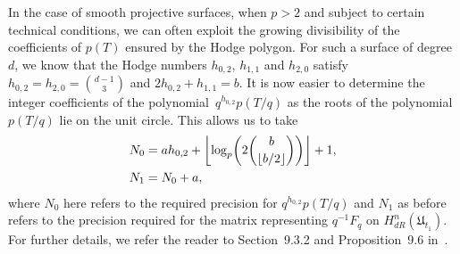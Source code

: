 \begin{rem} \label{rem:N0Surfaces}
In the case of smooth projective surfaces, when $p > 2$ and subject to 
certain technical conditions, we can often exploit the growing divisibility 
of the coefficients of $p(T)$ ensured by the Hodge polygon.  For such a surface 
of degree~$d$, we know that the Hodge numbers $h_{0,2}$, $h_{1,1}$ and $h_{2,0}$ 
satisfy $h_{0,2} = h_{2,0} = \binom{d-1}{3}$ and $2 h_{0,2} + h_{1,1} = b$. 
It is now easier to determine the integer coefficients of the 
polynomial~$q^{h_{0,2}} p(T/q)$ as the roots of the polynomial $p(T/q)$ lie 
on the unit circle.  This allows us to take 
\begin{align*}
N_0 & = a h_{0,2} + \left\lfloor\log_p \biggl( 2 \binom{b}{\left\lfloor b/2\right\rfloor}\biggr)\right\rfloor + 1,\\
N_1 & = N_0 + a,
\end{align*}
where $N_0$ here refers to the required precision for $q^{h_{0,2}} p(T/q)$ 
and $N_1$ as before refers to the precision required for the matrix 
representing $q^{-1} F_q$ on $H_{dR}^{n}(\mathfrak{U}_{t_1})$.
For further details, we refer the reader to {Section~9.3.2} 
and {Proposition~9.6} in~\citep{Lauder2006}.
\end{rem}

